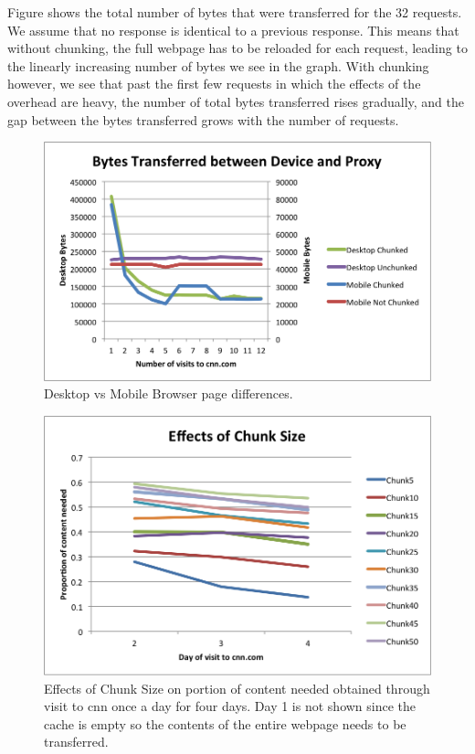 Figure shows the total number of bytes that were transferred for the 32 requests. 
We assume that no response is identical to a previous response. 
This means that without chunking, the full webpage has to be reloaded for each request, leading to the linearly increasing number of bytes we see in the graph. 
With chunking however, we see that past the first few requests in which the effects of the overhead are heavy, the number of total bytes transferred rises gradually, and the gap between the bytes transferred grows with the number of requests.


\begin{figure}[h] 
\centering \includegraphics[scale=0.40]{images/desktopmobile.png}
\caption{Desktop vs Mobile Browser page differences.}
\end{figure}

\begin{figure}[h] 
\centering \includegraphics[scale=0.40]{images/chunksize.png}
\caption{Effects of Chunk Size on portion of content needed obtained through visit to cnn once a day for four days. Day 1 is not shown since the cache is empty so the contents of the entire webpage needs to be transferred.}
\end{figure}

